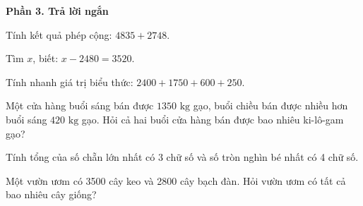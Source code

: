\textbf{Phần 3. Trả lời ngắn}

\begin{ex} %
Tính kết quả phép cộng: $4835 + 2748$.
\end{ex}

\begin{ex} %
Tìm $x$, biết: $x - 2480 = 3520$.
\end{ex}

\begin{ex} %
Tính nhanh giá trị biểu thức: $2400 + 1750 + 600 + 250$.
\end{ex}

\begin{ex} %
Một cửa hàng buổi sáng bán được $1350\text{ kg}$ gạo, buổi chiều bán được nhiều hơn buổi sáng $420\text{ kg}$ gạo. Hỏi cả hai buổi cửa hàng bán được bao nhiêu ki-lô-gam gạo?
\end{ex}

\begin{ex} %
Tính tổng của số chẵn lớn nhất có 3 chữ số và số tròn nghìn bé nhất có 4 chữ số.
\end{ex}

\begin{ex} %
Một vườn ươm có 3500 cây keo và 2800 cây bạch đàn. Hỏi vườn ươm có tất cả bao nhiêu cây giống?
\end{ex}
